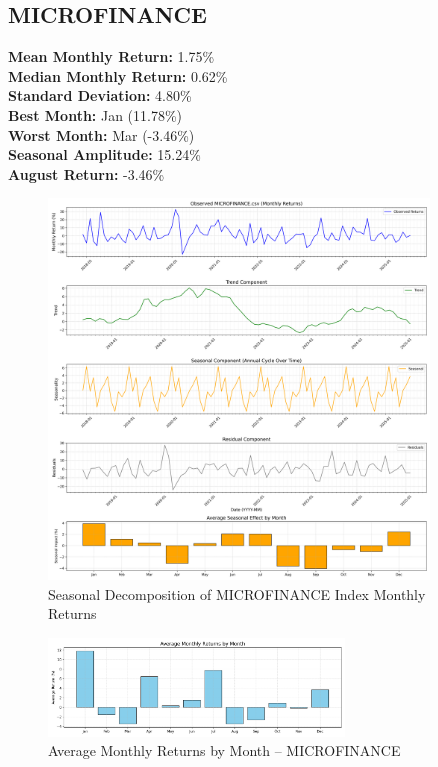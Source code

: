 \documentclass[12pt]{article}
\begin{document}
\clearpage

\subsection{MICROFINANCE}
\textbf{Mean Monthly Return:} 1.75\% \\
\textbf{Median Monthly Return:} 0.62\% \\
\textbf{Standard Deviation:} 4.80\% \\
\textbf{Best Month:} Jan (11.78\%) \\
\textbf{Worst Month:} Mar (-3.46\%) \\
\textbf{Seasonal Amplitude:} 15.24\% \\
\textbf{August Return:} -3.46\% \\

\begin{figure}[h!]
    \centering
    \includegraphics[width=0.9\textwidth]{decomposition_outputs/MICROFINANCE_seasonal_decomposition.png}
    \caption{Seasonal Decomposition of MICROFINANCE Index Monthly Returns}
\end{figure}

\begin{figure}[h!]
    \centering
    \includegraphics[width=0.7\textwidth]{decomposition_outputs/MICROFINANCE_avg_monthly_returns.png}
    \caption{Average Monthly Returns by Month -- MICROFINANCE}
\end{figure}
\end{document}
